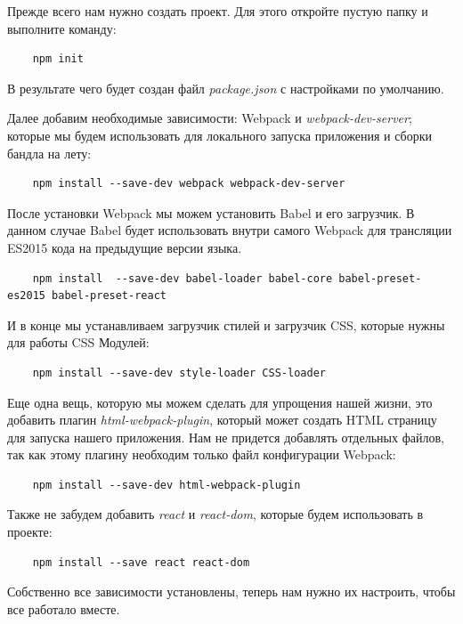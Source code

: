 Прежде всего нам нужно создать проект. Для этого откройте пустую папку и выполните команду:

\begin{lstlisting}
	npm init
\end{lstlisting}

В результате чего будет создан файл \textit{package.json} с настройками по умолчанию.

Далее добавим необходимые зависимости: Webpack и \textit{webpack-dev-server}; которые мы будем использовать для локального запуска приложения и сборки бандла на лету:

\begin{lstlisting}
	npm install --save-dev webpack webpack-dev-server
\end{lstlisting}

После установки Webpack мы можем установить Babel и его загрузчик. В данном случае Babel будет использовать внутри самого Webpack для трансляции ES2015 кода на предыдущие версии языка. 

\begin{lstlisting}
	npm install  --save-dev babel-loader babel-core babel-preset-es2015 babel-preset-react
\end{lstlisting}

И в конце мы устанавливаем загрузчик стилей и загрузчик CSS, которые нужны для работы CSS Модулей:

\begin{lstlisting}
	npm install --save-dev style-loader CSS-loader
\end{lstlisting}

Еще одна вещь, которую мы можем сделать для упрощения нашей жизни, это добавить плагин \textit{html-webpack-plugin}, который может создать HTML страницу для запуска нашего приложения. Нам не придется добавлять отдельных файлов, так как этому плагину необходим только файл конфигурации Webpack:

\begin{lstlisting}
	npm install --save-dev html-webpack-plugin
\end{lstlisting}

Также не забудем добавить \textit{react} и \textit{react-dom}, которые будем использовать в проекте:

\begin{lstlisting}
	npm install --save react react-dom
\end{lstlisting}

Собственно все зависимости установлены, теперь нам нужно их настроить, чтобы все работало вместе.

